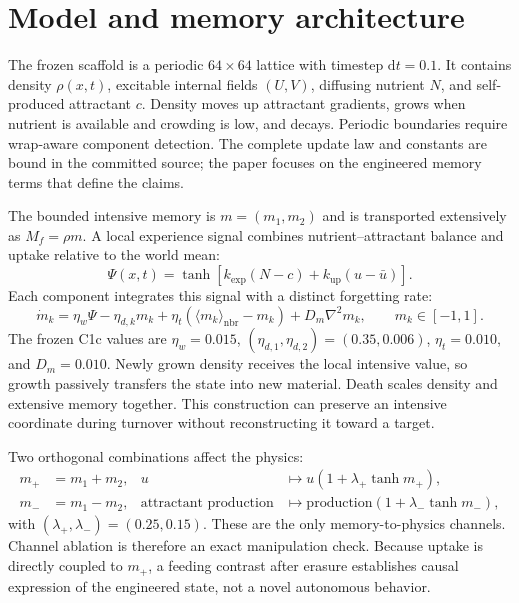 \documentclass[11pt]{article}
\begin{document}
\section{Model and memory architecture}

The frozen scaffold is a periodic $64\times64$ lattice with timestep $\mathrm{d}t=0.1$. It contains density $\rho(x,t)$, excitable internal fields $(U,V)$, diffusing nutrient $N$, and self-produced attractant $c$. Density moves up attractant gradients, grows when nutrient is available and crowding is low, and decays. Periodic boundaries require wrap-aware component detection. The complete update law and constants are bound in the committed source; the paper focuses on the engineered memory terms that define the claims.

The bounded intensive memory is $m=(m_1,m_2)$ and is transported extensively as $M_f=\rho m$. A local experience signal combines nutrient--attractant balance and uptake relative to the world mean:
\begin{equation}
\Psi(x,t)=\tanh\!\left[k_{\mathrm{exp}}(N-c)+k_{\mathrm{up}}(u-\bar u)\right].
\label{eq:psi}
\end{equation}
Each component integrates this signal with a distinct forgetting rate:
\begin{equation}
\dot m_k=\eta_w\Psi-\eta_{d,k}m_k+\eta_t\left(\langle m_k\rangle_{\mathrm{nbr}}-m_k\right)+D_m\nabla^2m_k,
\qquad m_k\in[-1,1].
\label{eq:write}
\end{equation}
The frozen C1c values are $\eta_w=0.015$, $(\eta_{d,1},\eta_{d,2})=(0.35,0.006)$, $\eta_t=0.010$, and $D_m=0.010$. Newly grown density receives the local intensive value, so growth passively transfers the state into new material. Death scales density and extensive memory together. This construction can preserve an intensive coordinate during turnover without reconstructing it toward a target.

Two orthogonal combinations affect the physics:
\begin{align}
m_+ &= m_1+m_2, & u &\mapsto u\left(1+\lambda_+\tanh m_+\right),\\
m_- &= m_1-m_2, & \text{attractant production} &\mapsto \text{production}\left(1+\lambda_-\tanh m_-\right),
\end{align}
with $(\lambda_+,\lambda_-)=(0.25,0.15)$. These are the only memory-to-physics channels. Channel ablation is therefore an exact manipulation check. Because uptake is directly coupled to $m_+$, a feeding contrast after erasure establishes causal expression of the engineered state, not a novel autonomous behavior.
\end{document}
